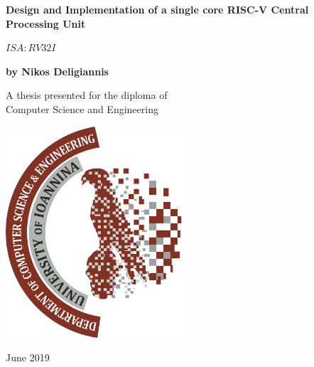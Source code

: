 
\graphicspath{{./teximages/}}
%
	
	\label{FirstPage}
	\begin{titlepage}
		\begin{center}
			\huge
			\textbf{Design and Implementation of a single core RISC-V Central Processing Unit}
			
			\vspace{0.5cm}
			\textit{$ISA : RV32I$}
			
			\vspace{1.5cm}
			\textbf{by Nikos Deligiannis}
			
			\vfill
			A thesis presented for the diploma of \\
			Computer Science and Engineering
			
			\vspace{0.8cm}
			\includegraphics[width=0.5\textwidth]{department}
			
			\large
			\vspace*{1cm}
			June 2019
			
		\end{center}
		
	\end{titlepage}

%